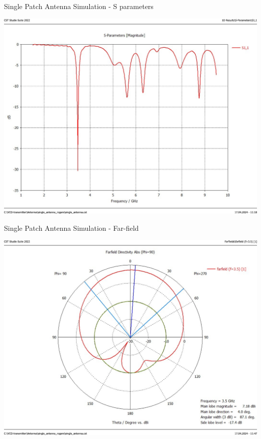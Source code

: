 \documentclass{beamer}
\begin{document}
\begin{frame}{Single Patch Antenna Simulation - S parameters}

\includegraphics[width=\linewidth]{images/Antenna/S11_first_anetenna_rogers.pdf}

\end{frame}

\begin{frame}{Single Patch Antenna Simulation - Far-field}

\includegraphics[width=\linewidth]{images/Antenna/farfield_first_antenna_1d_rogers.pdf}

\end{frame}
\end{document}
